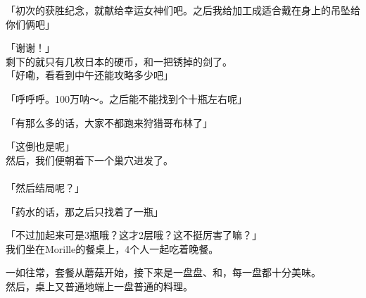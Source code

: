 「初次的获胜纪念，就献给幸运女神们吧。之后我给加工成适合戴在身上的吊坠给你们俩吧」

「谢谢！」\\

剩下的就只有几枚日本的硬币，和一把锈掉的剑了。\\

「好嘞，看看到中午还能攻略多少吧」

「呼呼呼。100万呐～。之后能不能找到个十瓶左右呢」

「有那么多的话，大家不都跑来狩猎哥布林了」

「这倒也是呢」\\

然后，我们便朝着下一个巢穴进发了。\\

\sqsplit\\

「然后结局呢？」

「药水的话，那之后只找着了一瓶」

「不过加起来可是3瓶哦？这才2层哦？这不挺厉害了嘛？」\\

我们坐在Morille的餐桌上，4个人一起吃着晚餐。

一如往常，套餐从蘑菇开始，接下来是一盘盘、和，每一盘都十分美味。\\

然后，桌上又普通地端上一盘普通的料理。\\

